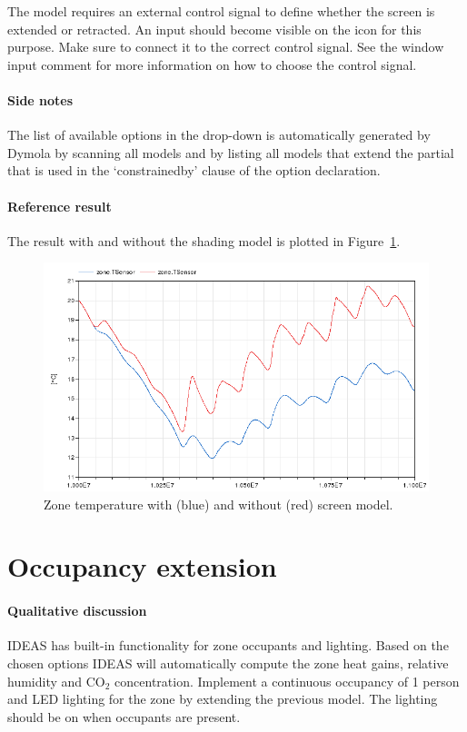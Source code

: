 \documentclass[10pt,a4paper]{article}
\begin{document}
The  model requires an external control signal to define
whether the screen is extended or retracted. 
An input should become visible on the  icon for this
purpose. Make sure to connect it to the correct control signal.
See the window input comment for more information on how
to choose the control signal.

\paragraph{Side notes}
The list of available options in the drop-down is automatically generated by
Dymola by scanning all models and by listing all models that extend the partial
that is used in the `constrainedby' clause of the option declaration.


\paragraph{Reference result}
The result with and without the shading model
is plotted in Figure~\ref{fig:res2}.

\begin{figure}
\centering
\includegraphics[scale=0.7]{Example2.png}
\caption{Zone temperature with (blue) and without (red) screen model.}
\label{fig:res2}
\end{figure}


\section{Occupancy extension}
\paragraph{Qualitative discussion}
IDEAS has built-in functionality for zone occupants and lighting.
Based on the chosen options IDEAS will automatically compute
the zone heat gains, relative humidity and CO$_2$ concentration.
Implement a continuous occupancy of 1 person and LED
lighting for the zone by extending the previous model.
The lighting should be on when occupants are present.
\end{document}
